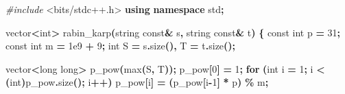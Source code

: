 \documentclass[
]{article}
\newenvironment{Shaded}{\begin{snugshade}}{\end{snugshade}}
\newcommand{\AttributeTok}[1]{\textcolor[rgb]{0.77,0.63,0.00}{#1}}
\newcommand{\ControlFlowTok}[1]{\textcolor[rgb]{0.13,0.29,0.53}{\textbf{#1}}}
\newcommand{\DataTypeTok}[1]{\textcolor[rgb]{0.13,0.29,0.53}{#1}}
\newcommand{\DecValTok}[1]{\textcolor[rgb]{0.00,0.00,0.81}{#1}}
\newcommand{\FloatTok}[1]{\textcolor[rgb]{0.00,0.00,0.81}{#1}}
\newcommand{\ImportTok}[1]{#1}
\newcommand{\KeywordTok}[1]{\textcolor[rgb]{0.13,0.29,0.53}{\textbf{#1}}}
\newcommand{\NormalTok}[1]{#1}
\newcommand{\OperatorTok}[1]{\textcolor[rgb]{0.81,0.36,0.00}{\textbf{#1}}}
\newcommand{\PreprocessorTok}[1]{\textcolor[rgb]{0.56,0.35,0.01}{\textit{#1}}}
\begin{document}
\begin{Shaded}
\begin{Highlighting}[]
\PreprocessorTok{\#include }\ImportTok{\textless{}bits/stdc++.h\textgreater{}}
\KeywordTok{using} \KeywordTok{namespace}\NormalTok{ std}\OperatorTok{;}

\NormalTok{vector}\OperatorTok{\textless{}}\DataTypeTok{int}\OperatorTok{\textgreater{}}\NormalTok{ rabin\_karp}\OperatorTok{(}\NormalTok{string }\AttributeTok{const}\OperatorTok{\&}\NormalTok{ s}\OperatorTok{,}\NormalTok{ string }\AttributeTok{const}\OperatorTok{\&}\NormalTok{ t}\OperatorTok{)} \OperatorTok{\{}
    \AttributeTok{const} \DataTypeTok{int}\NormalTok{ p }\OperatorTok{=} \DecValTok{31}\OperatorTok{;} 
    \AttributeTok{const} \DataTypeTok{int}\NormalTok{ m }\OperatorTok{=} \FloatTok{1e9} \OperatorTok{+} \DecValTok{9}\OperatorTok{;}
    \DataTypeTok{int}\NormalTok{ S }\OperatorTok{=}\NormalTok{ s}\OperatorTok{.}\NormalTok{size}\OperatorTok{(),}\NormalTok{ T }\OperatorTok{=}\NormalTok{ t}\OperatorTok{.}\NormalTok{size}\OperatorTok{();}

\NormalTok{    vector}\OperatorTok{\textless{}}\DataTypeTok{long} \DataTypeTok{long}\OperatorTok{\textgreater{}}\NormalTok{ p\_pow}\OperatorTok{(}\NormalTok{max}\OperatorTok{(}\NormalTok{S}\OperatorTok{,}\NormalTok{ T}\OperatorTok{));} 
\NormalTok{    p\_pow}\OperatorTok{[}\DecValTok{0}\OperatorTok{]} \OperatorTok{=} \DecValTok{1}\OperatorTok{;} 
    \ControlFlowTok{for} \OperatorTok{(}\DataTypeTok{int}\NormalTok{ i }\OperatorTok{=} \DecValTok{1}\OperatorTok{;}\NormalTok{ i }\OperatorTok{\textless{}} \OperatorTok{(}\DataTypeTok{int}\OperatorTok{)}\NormalTok{p\_pow}\OperatorTok{.}\NormalTok{size}\OperatorTok{();}\NormalTok{ i}\OperatorTok{++)} 
\NormalTok{        p\_pow}\OperatorTok{[}\NormalTok{i}\OperatorTok{]} \OperatorTok{=} \OperatorTok{(}\NormalTok{p\_pow}\OperatorTok{[}\NormalTok{i}\OperatorTok{{-}}\DecValTok{1}\OperatorTok{]} \OperatorTok{*}\NormalTok{ p}\OperatorTok{)} \OperatorTok{\%}\NormalTok{ m}\OperatorTok{;}


\end{Highlighting}
\end{Shaded}
\end{document}
